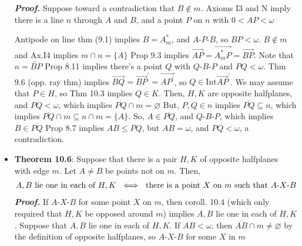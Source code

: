 \documentclass{report}
\begin{document}
\begin{itemize}
            \bigbreak \noindent 
            \textbf{\textit{Proof.}} Suppose toward a contradiction that $B \not\in m$. Axioms I3 and N imply there is a line $n$ through $A$ and $B$, and a point $P$ on $n$ with $0 < AP < \omega$
            \bigbreak \noindent 
            \begin{figure}[ht]
                \centering
                \label{fig:stac}
            \end{figure}
            \bigbreak \noindent 
            Antipode on line thm (9.1) implies $B = A_{m}^{*}$, and $ A\text{-}P\text{-}B$, so $BP < \omega$.
            \bigbreak \noindent 
            $B \not\in m$ and Ax.I4 implies $m\cap n = \{A\} $
            \bigbreak \noindent 
            Prop 9.3 implies $\overrightarrow{AP} = \overrightarrow{A_{m}^{*}P} = \overrightarrow{BP}$. Note that $n = \overleftrightarrow{BP} $
            \bigbreak \noindent 
            Prop 8.11 implies there's a point $Q$ with $ Q\text{-}B\text{-}P$ and $PQ < \omega$.
            \bigbreak \noindent 
            Thm 9.6 (opp. ray thm) implies $\overrightarrow{BQ} = \overrightarrow{BP}^{\prime} = \overrightarrow{AP^{\prime}}$, so $Q \in \text{Int}\overrightarrow{AP}^{\prime}$. We may assume that $P \in H$, so Thm 10.3 implies $Q \in K$. Then, $H,K$ are opposite halfplanes, and $PQ < \omega$, which implies $\overline{PQ} \cap m  = \varnothing $
            \bigbreak \noindent 
            But, $P,Q \in  n$ implies  $\overline{PQ} \subseteq n$, which implies $\overline{PQ} \cap m \subseteq n \cap m = \{A\} $. So, $A \in \overline{PQ}$, and $ Q\text{-}B\text{-}P$, which implies $ B \in \overline{PQ}$
            \bigbreak \noindent 
            Prop 8.7 implies $AB \leq PQ$, but $AB = \omega$, and $PQ < \omega$, a contradiction.
            \endpf
        \item \textbf{Theorem 10.6}: Suppose that there is a pair $H,K$ of opposite halfplanes with edge $m$. Let $A \ne B$ be points not on $m$. Then, 
            \begin{align*}
                A,B \text{ lie one in each of $H,K$ } \iff \text{ there is a point $X$ on $m$ such that $ A\text{-}X\text{-}B $}
            \end{align*}
            \bigbreak \noindent 
            \textbf{\textit{Proof.}} If $ A\text{-}X\text{-}B$ for some point $X$ on $m$, then coroll. 10.4 (which only required that $H,K$ be opposed around $m$) implies $A,B$ lie one in each of $H,K$.
            \bigbreak \noindent 
            Suppose that $A,B$ lie one in each of $H,K$. If $AB < \omega$, then $\overline{AB} \cap m \ne \varnothing $ by the definition of opposite halfplanes, so $ A\text{-}X\text{-} B$ for some $X$ in $m$

\end{itemize}
\end{document}
